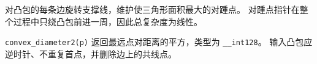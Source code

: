 对凸包的每条边旋转支撑线，维护使三角形面积最大的对踵点。
对踵点指针在整个过程中只绕凸包前进一周，因此总复杂度为线性。

\texttt{convex\_diameter2(p)} 返回最远点对距离的平方，类型为 \texttt{\_\_int128}。
输入凸包应逆时针、不重复首点，并删除边上的共线点。
